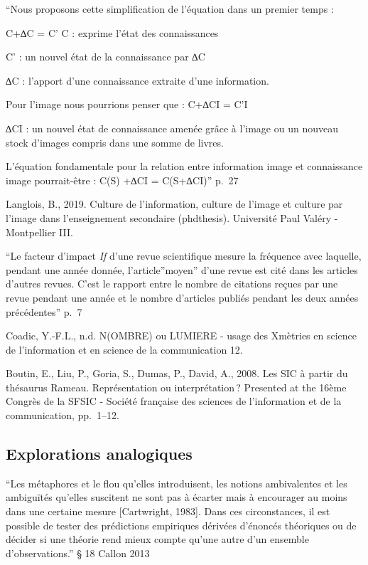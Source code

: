 \documentclass[
  letterpaper,
  DIV=11,
  numbers=noendperiod]{scrreprt}
\begin{document}
``Nous proposons cette simplification de l'équation dans un premier
temps :

C+∆C = C' C : exprime l'état des connaissances

C' : un nouvel état de la connaissance par ∆C

∆C : l'apport d'une connaissance extraite d'une information.

Pour l'image nous pourrions penser que : C+∆CI = C'I

∆CI : un nouvel état de connaissance amenée grâce à l'image ou un
nouveau stock d'images compris dans une somme de livres.

L'équation fondamentale pour la relation entre information image et
connaissance image pourrait-être : C(S) +∆CI = C(S+∆CI)'' p.~27

Langlois, B., 2019. Culture de l'information, culture de l'image et
culture par l'image dans l'enseignement secondaire (phdthesis).
Université Paul Valéry - Montpellier III.

``Le facteur d'impact \emph{If} d'une revue scientifique mesure la
fréquence avec laquelle, pendant une année donnée, l'article''moyen''
d'une revue est cité dans les articles d'autres revues. C'est le rapport
entre le nombre de citations reçues par une revue pendant une année et
le nombre d'articles publiés pendant les deux années précédentes'' p.~7

Coadic, Y.-F.L., n.d. N(OMBRE) ou LUMIERE - usage des Xmètries en
science de l'information et en science de la communication 12.

Boutin, E., Liu, P., Goria, S., Dumas, P., David, A., 2008. Les SIC à
partir du thésaurus Rameau. Représentation ou interprétation\,?
Presented at the 16ème Congrès de la SFSIC - Société française des
sciences de l'information et de la communication, pp.~1--12.

\hypertarget{explorations-analogiques}{%
\subsection{Explorations analogiques}\label{explorations-analogiques}}

``Les métaphores et le flou qu'elles introduisent, les notions
ambivalentes et les ambiguïtés qu'elles suscitent ne sont pas à écarter
mais à encourager au moins dans une certaine mesure {[}Cartwright,
1983{]}. Dans ces circonstances, il est possible de tester des
prédictions empiriques dérivées d'énoncés théoriques ou de décider si
une théorie rend mieux compte qu'une autre d'un ensemble
d'observations.'' § 18 Callon 2013
\end{document}
